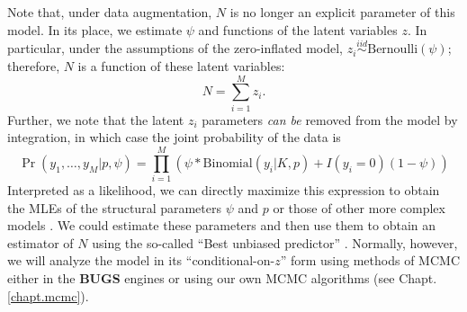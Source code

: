 Note that, under data augmentation, $N$ is no longer an explicit
parameter of this model. In its place, we estimate $\psi$ and
functions of the latent variables $z$. In particular, under the
assumptions of the zero-inflated model, $z_{i} \stackrel{iid}{\sim}
\mbox{Bernoulli}(\psi)$; therefore, $N$ is a function of these latent
variables:
 \[
 N = \sum_{i=1}^{M} z_{i}.
\]
Further, we note that the latent $z_i$ parameters {\it can be} removed
 from
the model by integration, in which case the joint probability of the
data is
\begin{equation}
  \Pr(y_1, \ldots, y_M | p, \psi) = \prod_{i=1}^M  \left( 
\psi *\mathrm{Binomial}(y_i | K, p) +  I(y_i=0) (1-\psi) \right)
\end{equation}
Interpreted as a likelihood, we can directly maximize this expression
to obtain the MLEs of the structural parameters $\psi$ and $p$ or
those of other more complex models \citep[e.g., see][]{royle:2006}. We
could estimate these parameters and then use them to obtain an
estimator of $N$ using the so-called ``Best unbiased predictor''
\citep[see][]{royle_dorazio:2012}. Normally, however, we will analyze
the model in its ``conditional-on-$z$'' form using methods of MCMC
either in the {\bf BUGS} engines or using our own MCMC algorithms (see
Chapt. \ref{chapt.mcmc}).

